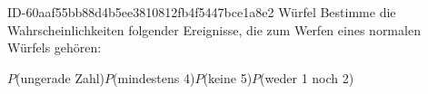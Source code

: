 \begin{exercise}
      {ID-60aaf55bb88d4b5ee3810812fb4f5447bce1a8e2}
      {Würfel}
  \ifproblem\problem
    Bestimme die Wahrscheinlichkeiten folgender Ereignisse, die zum Werfen eines
    \glqq normalen\grqq{} Würfels gehören:
    \begin{center}
      $P$(ungerade Zahl)\qquad$P$(mindestens 4)\qquad$P$(keine 5)\qquad$P$(weder 1 noch 2)
    \end{center}
  \fi
\end{exercise}
